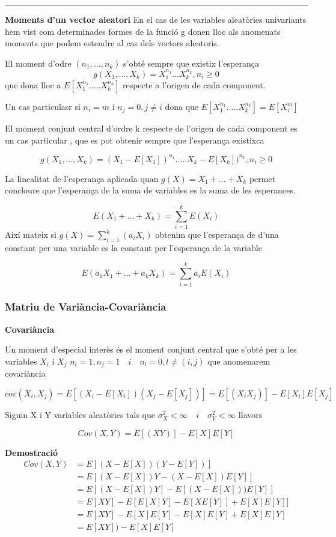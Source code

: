 \documentclass[
  catalan,
]{article}
\theoremstyle{definition}
\theoremstyle{definition}
\theoremstyle{definition}
\theoremstyle{definition}
\theoremstyle{remark}
\begin{document}
\begin{center}\rule{0.5\linewidth}{0.5pt}\end{center}

\textbf{Moments d'un vector aleatori}
En el cas de les variables aleatòries univariants hem vist com determinades formes de la funció g donen lloc als anomenats moments que podem estendre al cas dels vectors aleatoris.

El moment d'odre \((n_1,...,n_k)\) s'obté sempre que existix l'esperança
\[
g(X_1,...,X_k)=X_1^{n_1} ...X_k^{n_k}, n_i \geq 0
\]
que dona lloc a \(E[X_1^{n_1} .....X_k^{n_k}]\) respecte a l'origen de cada component.

Un cas particulasr si \(n_i=m\) i \(n_j=0, j \neq i\) dona que \(E[X_1^{n_1} .....X_k^{n_k}]=E[X_i^m]\)

El moment conjunt central d'ordre k respecte de l'origen de cada component es un cas particular , que es pot obtenir sempre que l'esperança existixca

\[
g(X_1,...,X_k)=(X_1-E[X_1])^{n_1} .....X_k-E[X_k])^{n_k}, n_i \geq 0
\]

La linealitat de l'esperança aplicada quan \(g(X)=X_1+...+X_k\) permet concloure que l'esperança de la suma de variables es la suma de les esperances.

\[
E(X_1+...+X_k) =\sum_{i=1}^kE(X_i)
\]
Així mateix si \(g(X)=\sum_{i=1}^k (a_i X_i)\) obtenim que l'esperança de d'una constant per una variable es la constant per l'esperança de la variable

\[
E(a_1X_1+...+a_kX_k) =\sum_{i=1}^k a_i E(X_i)
\]

\subsubsection{Matriu de Variància-Covariància}\label{matriu-de-variuxe0ncia-covariuxe0ncia}

\textbf{Covariància}

Un moment d'especial interès és el moment conjunt central que s'obté per a les variables \(X_i\) i \(X_j\) \(n_i=1, n_j=1 \quad  i \quad  n_l=0, l\neq (i,j)\) que anomenarem covariància

\[
cov(X_i,X_j)=E[(X_i-E[X_i])(X_j-E[X_j])]=E[(X_iX_j)]-E[X_i]E[X_j] 
\]

Siguin X i Y variables aleatòries tals que \(\sigma_X^2 <\infty \quad i \quad  \sigma_Y^2 <\infty\) llavors

\[
Cov(X,Y)=E[(XY)]-E[X]E[Y]  
\]

\textbf{Demostració}
\[
\begin{aligned}
Cov(X, Y ) &= E[(X − E[X])(Y − E[Y])] \\ 
&= E[(X − E[X])Y − (X − E[X])E[Y]]  \\
&= E[(X − E[X])Y ] − E[(X − E[X]))E[Y]] \\
&= E[XY] − E[E[X]Y]  − E[XE[Y]] + E[X]E[Y]] \\
&= E[XY] − E[X]E[Y] − E[X]E[Y] + E[X]E[Y] \\
&= E[XY]) − E[X] E[Y]
\end{aligned}
\]
\end{document}

